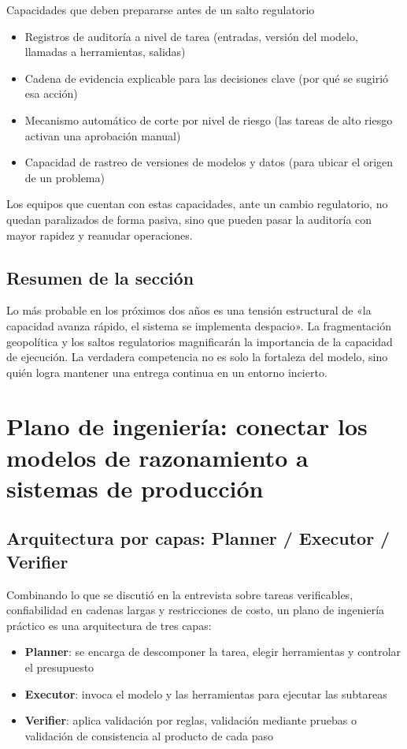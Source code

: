 \documentclass[a4paper]{article}
\begin{document}
\begin{importantbox}{Capacidades que deben prepararse antes de un salto regulatorio}
\begin{itemize}
    \item Registros de auditoría a nivel de tarea (entradas, versión del modelo, llamadas a herramientas, salidas)
    \item Cadena de evidencia explicable para las decisiones clave (por qué se sugirió esa acción)
    \item Mecanismo automático de corte por nivel de riesgo (las tareas de alto riesgo activan una aprobación manual)
    \item Capacidad de rastreo de versiones de modelos y datos (para ubicar el origen de un problema)
\end{itemize}

Los equipos que cuentan con estas capacidades, ante un cambio regulatorio, no quedan paralizados de forma pasiva, sino que pueden pasar la auditoría con mayor rapidez y reanudar operaciones.
\end{importantbox}

\subsection{Resumen de la sección}

Lo más probable en los próximos dos años es una tensión estructural de «la capacidad avanza rápido, el sistema se implementa despacio». La fragmentación geopolítica y los saltos regulatorios magnificarán la importancia de la capacidad de ejecución. La verdadera competencia no es solo la fortaleza del modelo, sino quién logra mantener una entrega continua en un entorno incierto.
\section{Plano de ingeniería: conectar los modelos de razonamiento a sistemas de producción}

\subsection{Arquitectura por capas: Planner / Executor / Verifier}

Combinando lo que se discutió en la entrevista sobre tareas verificables, confiabilidad en cadenas largas y restricciones de costo, un plano de ingeniería práctico es una arquitectura de tres capas:
\begin{itemize}
    \item \textbf{Planner}: se encarga de descomponer la tarea, elegir herramientas y controlar el presupuesto
    \item \textbf{Executor}: invoca el modelo y las herramientas para ejecutar las subtareas
    \item \textbf{Verifier}: aplica validación por reglas, validación mediante pruebas o validación de consistencia al producto de cada paso
\end{itemize}
\end{document}
